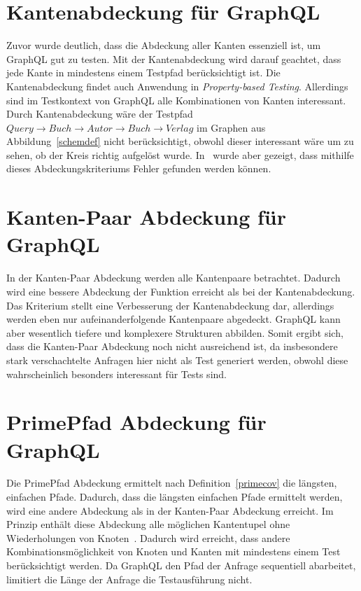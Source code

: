 \section{Kantenabdeckung für GraphQL}

Zuvor wurde deutlich, dass die Abdeckung aller Kanten essenziell ist, um GraphQL gut zu testen.
Mit der Kantenabdeckung wird darauf geachtet, dass jede Kante in mindestens einem Testpfad berücksichtigt ist.
Die Kantenabdeckung findet auch Anwendung in \textit{Property-based Testing}\cite[vgl. D-RQ1 ]{property-based-testing}.
Allerdings sind im Testkontext von GraphQL alle Kombinationen von Kanten interessant.
Durch Kantenabdeckung wäre der Testpfad $Query \rightarrow Buch \rightarrow Autor \rightarrow Buch \rightarrow Verlag$
im Graphen aus Abbildung~\ref{schemdef} nicht berücksichtigt, obwohl dieser interessant wäre um zu sehen, ob der Kreis richtig aufgelöst wurde.
In~\cite{property-based-testing} wurde aber gezeigt, dass mithilfe dieses Abdeckungskriteriums Fehler gefunden werden können.

\section{Kanten-Paar Abdeckung für GraphQL}

In der Kanten-Paar Abdeckung werden alle Kantenpaare betrachtet.
Dadurch wird eine bessere Abdeckung der Funktion erreicht als bei der Kantenabdeckung.
Das Kriterium stellt eine Verbesserung der Kantenabdeckung dar, allerdings werden eben nur aufeinanderfolgende Kantenpaare abgedeckt.
GraphQL kann aber wesentlich tiefere und komplexere Strukturen abbilden.
Somit ergibt sich, dass die Kanten-Paar Abdeckung noch nicht ausreichend ist, da insbesondere stark verschachtelte Anfragen hier nicht als Test generiert werden,
obwohl diese wahrscheinlich besonders interessant für Tests sind.

\section{PrimePfad Abdeckung für GraphQL}

Die PrimePfad Abdeckung ermittelt nach Definition~\ref{primecov} die längsten, einfachen Pfade.
Dadurch, dass die längsten einfachen Pfade ermittelt werden, wird eine andere Abdeckung als in der Kanten-Paar Abdeckung erreicht.
Im Prinzip enthält diese Abdeckung alle möglichen Kantentupel ohne Wiederholungen von Knoten~\cite[vgl. S. 42]{software-testing}.
Dadurch wird erreicht, dass andere Kombinationsmöglichkeit von Knoten und Kanten mit mindestens einem Test berücksichtigt werden.
Da GraphQL den Pfad der Anfrage sequentiell abarbeitet, limitiert die Länge der Anfrage die Testausführung nicht.

